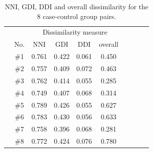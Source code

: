 		\begin{table}[h]
			\centering
			\caption{NNI, GDI, DDI and overall dissimilarity for the 8 case-control group pairs.}\label{tab:result2}
			\bgroup
			\def\arraystretch{1.4}
			\begin{tabular}{cc|cccccccc} \toprule
				& & \multicolumn{4}{c}{Dissimilarity measure} \\
				                                         & No. & NNI                                   & GDI                                   & DDI                                   & overall                          \\ \bottomrule
				\multirow{9}{*}{\rotatebox{90}{Control}} & \#1 & 0.761                                 & 0.422                                 & 0.061                                 & 0.450                            \\
				                                         & \#2 & 0.757                                 & 0.409                                 & 0.072                                 & 0.463                            \\
				                                         & \#3 & 0.762                                 & 0.414                                 & \leavevmode\cellcolor{lightgray}0.055 & \leavevmode\cellcolor{gray}0.285 \\
				                                         & \#4 & \leavevmode\cellcolor{lightgray}0.749 & 0.407                                 & 0.068                                 & 0.314                            \\
				                                         & \#5 & 0.789                                 & 0.426                                 & \leavevmode\cellcolor{lightgray}0.055 & 0.627                            \\
				                                         & \#6 & 0.783                                 & 0.430                                 & 0.056                                 & 0.633                            \\
				                                         & \#7 & 0.758                                 & \leavevmode\cellcolor{lightgray}0.396 & 0.068                                 & \leavevmode\cellcolor{gray}0.281 \\
				                                         & \#8 & 0.772                                 & 0.424                                 & 0.076                                 & 0.780                            \\ \bottomrule
			\end{tabular}
			\egroup
		\end{table}
								
